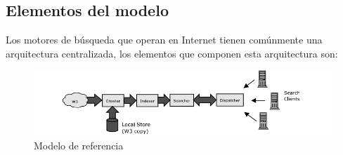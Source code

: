 \documentclass[a4paper, 11pt]{article} %
\begin{document}
	\subsection{Elementos del modelo}
	Los motores de búsqueda que operan en Internet tienen comúnmente una arquitectura centralizada, los elementos que componen esta arquitectura son:
	\begin{figure}[H]
	    \centering
    	\includegraphics[scale=0.75]{./img/modeloreferente.png}
	    \caption{Modelo de referencia}
	    \label{fig:my_label}
	\end{figure}
\end{document}
